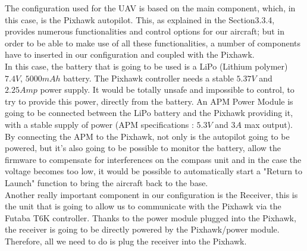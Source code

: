 \documentclass[12pt]{article}
\begin{document}
\noindent The configuration used for the UAV is based on the main component, which, in this case, is the Pixhawk autopilot. This, as explained in the Section3.3.4, provides numerous functionalities and control options for our aircraft; but in order to be able to make use of all these functionalities, a number of components have to inserted in our configuration and coupled with the Pixhawk. \\

\noindent In this case, the battery that is going to be used is a LiPo (Lithium polymer) $7.4V$, $5000mAh$ battery. The Pixhawk controller needs a stable $5.37V$ and $2.25Amp$ power supply. It would be totally unsafe and impossible to control, to try to provide this power, directly from the battery. An APM Power Module is going to be connected between the LiPo battery and the Pixhawk providing it, with a stable supply of power (APM specifications : $5.3V$ and $3A$ max output). By connecting the APM to the Pixhawk, not only is the autopilot going to be powered, but it's also going to be possible to monitor the battery, allow the firmware to compensate for interferences on the compass unit and in the case the voltage becomes too low, it would be possible to automatically start a "Return to Launch" function to bring the aircraft back to the base. \cite{SENSOR1} \\

\noindent Another really important component in our configuration is the Receiver, this is the unit that is going to allow us to communicate with the Pixhawk via the Futaba T6K controller. Thanks to the power module plugged into the Pixhawk, the receiver is going to be directly powered by the Pixhawk/power module. Therefore, all we need to do is plug the receiver into the Pixhawk. \\
\end{document}
